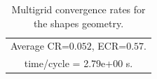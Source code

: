 \begin{table}[hbt]
\begin{center}
{\begin{tabular}{|c|c|c|c|c|}
\multicolumn{5}{|c|}{Average CR=$0.052$, ECR=$0.57$.}  \\
\multicolumn{5}{|c|}{time/cycle = 2.79e+00 s.}  \\
\hline 
\end{tabular}
} %
\end{center}
\caption{Multigrid convergence rates for the shapes geometry.}
 \label{tab:shapesII} 
\end{table}







\clearpage
